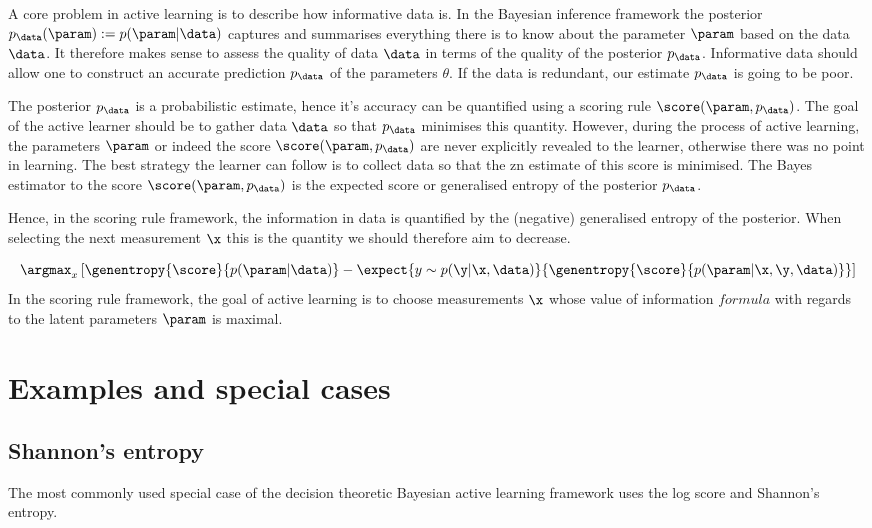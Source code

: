 A core problem in active learning is to describe how informative data is. In the Bayesian inference framework the posterior $p_\data(\param) := p(\param\vert\data)$ captures and summarises everything there is to know about the parameter $\param$ based on the data $\data$. It therefore makes sense to assess the quality of data $\data$ in terms of the quality of the posterior $p_\data$. Informative data should allow one to construct an accurate prediction $p_\data$ of the parameters $\theta$. If the data is redundant, our estimate $p_\data$ is going to be poor.

The posterior $p_\data$ is a probabilistic estimate, hence it's accuracy can be quantified using a scoring rule $\score(\param,p_\data)$. The goal of the active learner should be to gather data $\data$ so that $p_\data$ minimises this quantity. However, during the process of active learning, the parameters $\param$ or indeed the score $\score(\param,p_\data)$ are never explicitly revealed to the learner, otherwise there was no point in learning. The best strategy the learner can follow is to collect data so that the zn estimate of this score is minimised. The Bayes estimator to the score $\score(\param,p_\data)$ is the expected score or generalised entropy of the posterior $p_\data$.

Hence, in the scoring rule framework, the information in data is quantified by the (negative) generalised entropy of the posterior. When selecting the next measurement $\x$ this is the quantity we should therefore aim to decrease.

\begin{equation}
\argmax_x \left[ \genentropy{\score}{p(\param\vert\data)} - \expect{y\sim p(\y\vert \x, \data)}{\genentropy{\score}{p(\param\vert \x,\y,\data)} }\right ]
\end{equation}
In the scoring rule framework, the goal of active learning is to choose measurements $\x$ whose value of information $formula$ with regards to the latent parameters $\param$ is maximal.

\section{Examples and special cases}
\subsection{Shannon's entropy}

The most commonly used special case of the decision theoretic Bayesian active learning framework uses the log score and Shannon's entropy. 

